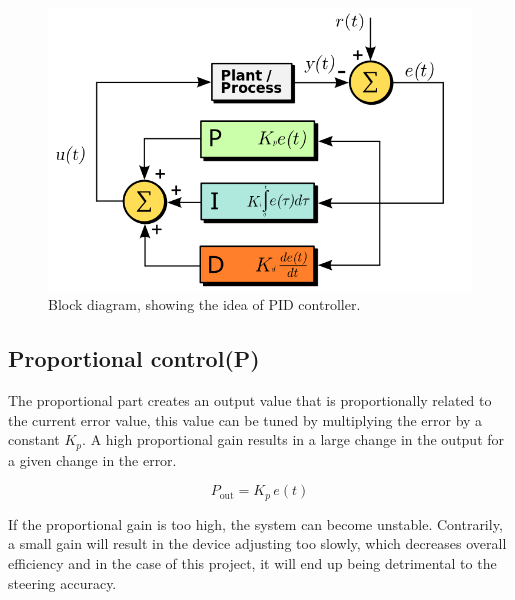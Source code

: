 \begin{figure}[h!]
  \centering
  \includegraphics[width=1.0\textwidth]{figures/PID_block.png}  
\caption{Block diagram, showing the idea of PID controller.}   
  \label{PID controller}
\end{figure}

\newpage

\subsection {Proportional control(P)}
The proportional part creates an output value that is proportionally related to the current error value, this value can be tuned by multiplying the error by a constant $K_p$. A high proportional gain results in a large change in the output for a given change in the error. 


$$ P_{\mathrm{out}}=K_p\,{e(t)}$$  

If the proportional gain is too high, the system can become unstable. Contrarily, a small gain will result in the device adjusting too slowly, which decreases overall efficiency and in the case of this project, it will end up being detrimental to the steering accuracy.


